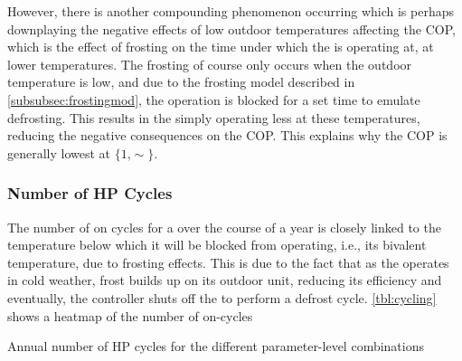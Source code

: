 However, there is another compounding phenomenon occurring which is perhaps downplaying the negative effects of low outdoor temperatures affecting the \ac{COP}, which is the effect of frosting on the time under which the \HP is operating at, at lower temperatures. The frosting of course only occurs when the outdoor temperature is low, and due to the frosting model described in \cref{subsubsec:frostingmod}, the \HP operation is blocked for a set time to emulate defrosting. This results in the \HP simply operating less at these temperatures, reducing the negative consequences on the \ac{COP}. This explains why the \ac{COP} is generally lowest at $\{1\text{,}\sim\}$. 

\subsubsection{Number of \acs{HP} Cycles}

The number of on cycles for a \HP over the course of a year is closely linked to the temperature below which it will be blocked from operating, i.e., its bivalent temperature, due to frosting effects. This is due to the fact that as the \HP operates in cold weather, frost builds up on its outdoor unit, reducing its efficiency and eventually, the controller shuts off the \HP to perform a defrost cycle. \cref{tbl:cycling} shows a heatmap of the number of on-cycles 

\begin{table}[htb]
    \footnotesize
    \centering
    \caption{Annual number of \acs{HP} cycles for the different parameter-level combinations}
    \label{tbl:cycling}
\end{table}


